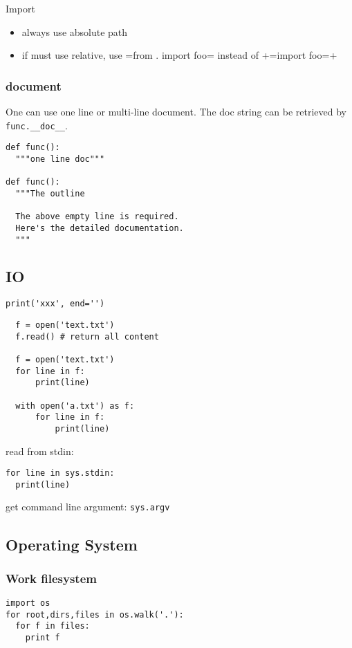 Import
\begin{itemize}
\item always use absolute path
\item if must use relative, use =from . import foo= instead of +=import foo=+
\end{itemize}

\subsubsection{document}
One can use one line or multi-line document.
The doc string can be retrieved by \verb$func.__doc__$.
\begin{lstlisting}
def func():
  """one line doc"""

def func():
  """The outline

  The above empty line is required.
  Here's the detailed documentation.
  """
\end{lstlisting}

\subsection{IO}
\begin{lstlisting}
print('xxx', end='')
\end{lstlisting}

\begin{lstlisting}
  f = open('text.txt')
  f.read() # return all content

  f = open('text.txt')
  for line in f:
      print(line)

  with open('a.txt') as f:
      for line in f:
          print(line)
\end{lstlisting}

read from stdin:
\begin{lstlisting}
for line in sys.stdin:
  print(line)
\end{lstlisting}

get command line argument: \texttt{sys.argv}






\subsection{Operating System}

\subsubsection{Work filesystem}
\begin{lstlisting}
import os
for root,dirs,files in os.walk('.'):
  for f in files:
    print f
\end{lstlisting}

